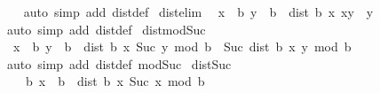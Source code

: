 \begin{isabellebody}
%
\isadelimproof
\ \ %
\endisadelimproof
%
\isatagproof
{}\isamarkupfalse%
\ {\isacharparenleft}{\kern0pt}auto\ simp\ add{\isacharcolon}{\kern0pt}\ dist{}{\isacharunderscore}{\kern0pt}def{\isacharparenright}{\kern0pt}%
\endisatagproof
{\isafoldproof}%
%
\isadelimproof
\isanewline
%
\endisadelimproof
\isanewline
{}\isamarkupfalse%
\ dist{}{\isacharunderscore}{\kern0pt}elim{\isacharunderscore}{\kern0pt}{}{\isacharcolon}{\kern0pt}\isanewline
\ \ {\isachardoublequoteopen}{\isasymlbrakk}x\ {\isacharless}{\kern0pt}\ b{\isacharsemicolon}{\kern0pt}\ y\ {\isacharless}{\kern0pt}\ b{\isasymrbrakk}\ {\isasymLongrightarrow}\ dist{}\ b\ x\ {\isacharparenleft}{\kern0pt}x{\isacharplus}{\kern0pt}y{\isacharparenright}{\kern0pt}\ {\isacharequal}{\kern0pt}\ y{\isachardoublequoteclose}\isanewline
%
\isadelimproof
\ \ %
\endisadelimproof
%
\isatagproof
{}\isamarkupfalse%
\ {\isacharparenleft}{\kern0pt}auto\ simp\ add{\isacharcolon}{\kern0pt}\ dist{}{\isacharunderscore}{\kern0pt}def{\isacharparenright}{\kern0pt}%
\endisatagproof
{\isafoldproof}%
%
\isadelimproof
\isanewline
%
\endisadelimproof
\isanewline
{}\isamarkupfalse%
\ dist{}{\isacharunderscore}{\kern0pt}mod{\isacharunderscore}{\kern0pt}Suc{\isacharcolon}{\kern0pt}\isanewline
\ \ {\isachardoublequoteopen}{\isasymlbrakk}x\ {\isacharless}{\kern0pt}\ b{\isacharsemicolon}{\kern0pt}\ y\ {\isacharless}{\kern0pt}\ b{\isasymrbrakk}\ {\isasymLongrightarrow}\ dist{}\ b\ x\ {\isacharparenleft}{\kern0pt}Suc\ y\ mod\ b{\isacharparenright}{\kern0pt}\ {\isacharequal}{\kern0pt}\ Suc\ {\isacharparenleft}{\kern0pt}dist{}\ b\ x\ y{\isacharparenright}{\kern0pt}\ mod\ b{\isachardoublequoteclose}\isanewline
%
\isadelimproof
\ \ %
\endisadelimproof
%
\isatagproof
{}\isamarkupfalse%
\ {\isacharparenleft}{\kern0pt}auto\ simp\ add{\isacharcolon}{\kern0pt}\ dist{}{\isacharunderscore}{\kern0pt}def\ mod{\isacharunderscore}{\kern0pt}Suc{\isacharparenright}{\kern0pt}%
\endisatagproof
{\isafoldproof}%
%
\isadelimproof
\isanewline
%
\endisadelimproof
\isanewline
{}\isamarkupfalse%
\ dist{}{\isacharunderscore}{\kern0pt}Suc{\isacharcolon}{\kern0pt}\isanewline
\ \ {\isachardoublequoteopen}{\isasymlbrakk}{}\ {\isasymle}\ b{\isacharsemicolon}{\kern0pt}\ x\ {\isacharless}{\kern0pt}\ b{\isasymrbrakk}\ {\isasymLongrightarrow}\ dist{}\ b\ x\ {\isacharparenleft}{\kern0pt}Suc\ x\ mod\ b{\isacharparenright}{\kern0pt}\ {\isacharequal}{\kern0pt}\ {}{\isachardoublequoteclose}\isanewline

\end{isabellebody}
